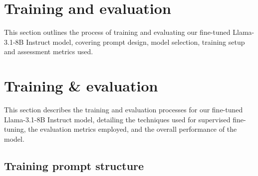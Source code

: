 





\section{Training and evaluation}

This section outlines the process of training and evaluating our fine-tuned Llama-3.1-8B Instruct model, covering prompt design, model selection, training setup and assessment metrics used.


\section{Training & evaluation}

This section describes the training and evaluation processes for our fine-tuned Llama-3.1-8B Instruct model, detailing the techniques used for supervised fine-tuning, the evaluation metrics employed, and the overall performance of the model.


\subsection{Training prompt structure}

